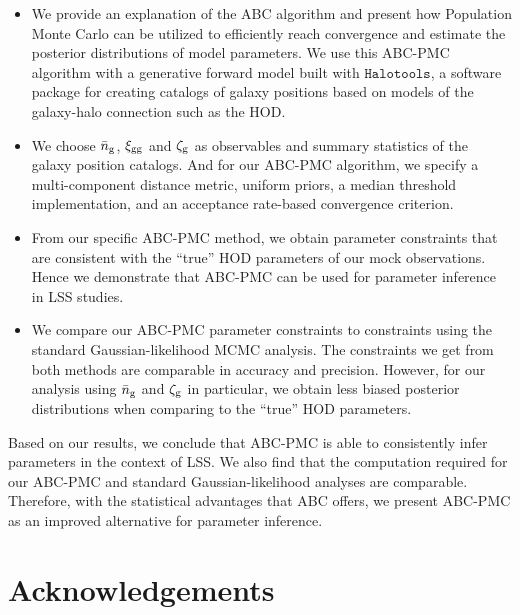 \documentclass[fleqn,usenatbib]{mnras}
\begin{document}
\begin{itemize}
\item We provide an explanation of the ABC algorithm and present how Population Monte Carlo can be utilized 
to efficiently reach convergence and estimate the posterior distributions of model parameters. 
We use this ABC-PMC algorithm with a generative forward model built with $\mathtt{Halotools}$, a software 
package for creating catalogs of galaxy positions based on models of the galaxy-halo connection such as the HOD. 

\item We choose $\bar{n}_{\mathrm{g}}$, $\xi_{\mathrm{gg}}$ and $\mathcal{\zeta}_{\rm g}$ as observables and summary statistics of the galaxy position catalogs. 
And for our ABC-PMC algorithm, we specify a multi-component distance metric, uniform priors, 
a median threshold implementation, and an acceptance rate-based convergence criterion.

\item From our specific ABC-PMC method, we obtain parameter constraints that are consistent with the ``true'' HOD parameters of our mock observations. Hence we demonstrate that ABC-PMC can be used for parameter inference in LSS studies. 

\item We compare our ABC-PMC parameter constraints to constraints using the standard Gaussian-likelihood
MCMC analysis. The constraints we get from both methods are comparable in accuracy and precision. However, 
for our analysis using $\bar{n}_{\mathrm{g}}$ and $\mathcal{\zeta}_{\rm g}$ in particular, we obtain less biased posterior distributions when
comparing to the ``true'' HOD parameters. 
\end{itemize}

Based on our results, we conclude that ABC-PMC is able to consistently infer parameters in the context
of LSS. We also find that the computation required for our ABC-PMC and standard Gaussian-likelihood 
analyses are comparable. Therefore, with the statistical advantages that ABC offers, we present ABC-PMC 
as an improved alternative for parameter inference. 


\section*{Acknowledgements}
\end{document}
